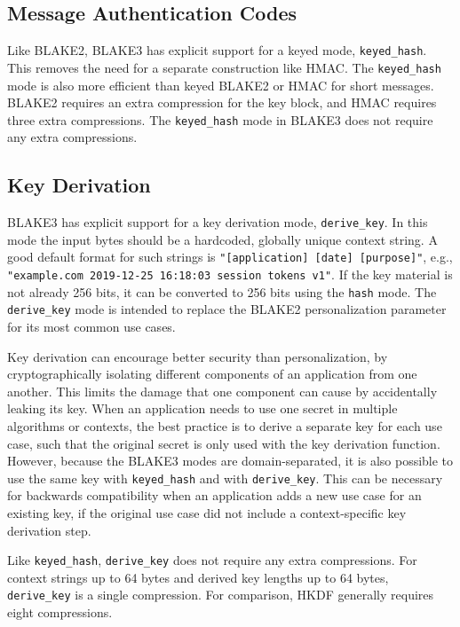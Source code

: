 \documentclass[11pt,notitlepage,a4paper]{article}
\begin{document}
\subsection{Message Authentication Codes}\label{sec:mac}

Like BLAKE2, BLAKE3 has explicit support for a keyed mode,
\texttt{keyed\_hash}. This removes the need for a separate construction like
HMAC. The \texttt{keyed\_hash} mode is also more efficient than keyed BLAKE2 or
HMAC for short messages. BLAKE2 requires an extra compression for the key
block, and HMAC requires three extra compressions. The \texttt{keyed\_hash}
mode in BLAKE3 does not require any extra compressions.

\subsection{Key Derivation}\label{sec:kdf}

BLAKE3 has explicit support for a key derivation mode, \texttt{derive\_key}. In
this mode the input bytes should be a hardcoded, globally unique context
string. A good default format for such strings is \texttt{"[application] [date]
[purpose]"}, e.g., \texttt{"example.com 2019-12-25 16:18:03 session tokens
v1"}. If the key material is not already 256 bits, it can be converted to 256
bits using the \texttt{hash} mode. The \texttt{derive\_key} mode is intended to
replace the BLAKE2 personalization parameter for its most common use cases.

Key derivation can encourage better security than personalization, by
cryptographically isolating different components of an application from one
another. This limits the damage that one component can cause by accidentally
leaking its key. When an application needs to use one secret in multiple
algorithms or contexts, the best practice is to derive a separate key for each
use case, such that the original secret is only used with the key derivation
function. However, because the BLAKE3 modes are domain-separated, it is also
possible to use the same key with \texttt{keyed\_hash} and with
\texttt{derive\_key}. This can be necessary for backwards compatibility when an
application adds a new use case for an existing key, if the original use case
did not include a context-specific key derivation step.

Like \texttt{keyed\_hash}, \texttt{derive\_key} does not require any extra
compressions. For context strings up to 64 bytes and derived key lengths up to
64 bytes, \texttt{derive\_key} is a single compression. For comparison, HKDF
generally requires eight compressions.
\end{document}
